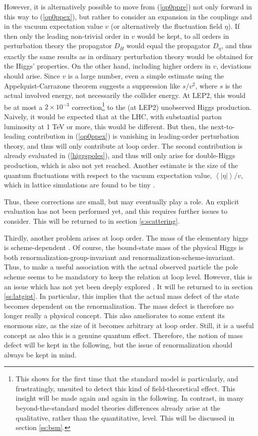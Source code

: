 \documentclass[final,12pt,3p,longtitle]{elsarticle}
\newcommand*{\pref}[1]{(\ref{#1})}
\newcommand*{\1}{1\!\!\!\bot}
\newcommand*{\la}{\left\langle}
\newcommand*{\ra}{\right\rangle}
\begin{document}
However, it is alternatively possible to move from \pref{op0ppre} not only forward in this way to \pref{op0ppex}, but rather to consider an expansion in the couplings and in the vacuum expectation value $v$ (or alternatively the fluctuation field $\eta$). If then only the leading non-trivial order in $v$ would be kept, to all orders in perturbation theory the propagator $D_H$ would equal the propagator $D_\eta$, and thus exactly the same results as in ordinary perturbation theory would be obtained for the Higgs' properties. On the other hand, including higher orders in $v$, deviations should arise. Since $v$ is a large number, even a simple estimate using the Appelquist-Carrazone theorem suggests a suppression like $s/v^2$, where $s$ is the actual involved energy, not necessarily the collider energy. At LEP2, this would be at most a $2\times 10^{-3}$ correction\footnote{This shows for the first time that the standard model is particularly, and frustratingly, unsuited to detect this kind of field-theoretical effect. This insight will be made again and again in the following. In contrast, in many beyond-the-standard model theories differences already arise at the qualitative, rather than the quantitative, level. This will be discussed in section \ref{ss:bsm}.} to the (at LEP2) unobserved Higgs production. Naively, it would be expected that at the LHC, with substantial parton luminosity at 1 TeV or more, this would be different. But then, the next-to-leading contribution in \pref{op0ppex} is vanishing in leading-order perturbation theory, and thus will only contribute at loop order. The second contribution is already evaluated in \pref{higgspoles}, and thus will only arise for double-Higgs production, which is also not yet reached. Another estimate is the size of the quantum fluctuations with respect to the vacuum expectation value, $\la|\eta|\ra/v$, which in lattice simulations are found to be tiny \cite{Maas:2012ct}.

Thus, these corrections are small, but may eventually play a role. An explicit evaluation has not been performed yet, and this requires further issues to consider. This will be returned to in section \ref{s:scattering}.

Thirdly, another problem arises at loop order. The mass of the elementary higgs is scheme-dependent \cite{Bohm:2001yx,Einhorn:1992um}. Of course, the bound-state mass of the physical Higgs is both renormalization-group-invariant and renormalization-scheme-invariant. Thus, to make a useful association with the actual observed particle the pole scheme \cite{Bohm:2001yx,Einhorn:1992um} seems to be mandatory to keep the relation at loop level. However, this is an issue which has not yet been deeply explored \cite{Maas:2013aia}. It will be returned to in section \ref{ss:latgipt}. In particular, this implies that the actual mass defect of the state becomes dependent on the renormalization. The mass defect is therefore no longer really a physical concept. This also ameliorates to some extent its enormous size, as the size of it becomes arbitrary at loop order. Still, it is a useful concept as also this is a genuine quantum effect. Therefore, the notion of mass defect will be kept in the following, but the issue of renormalization should always be kept in mind.
\end{document}
